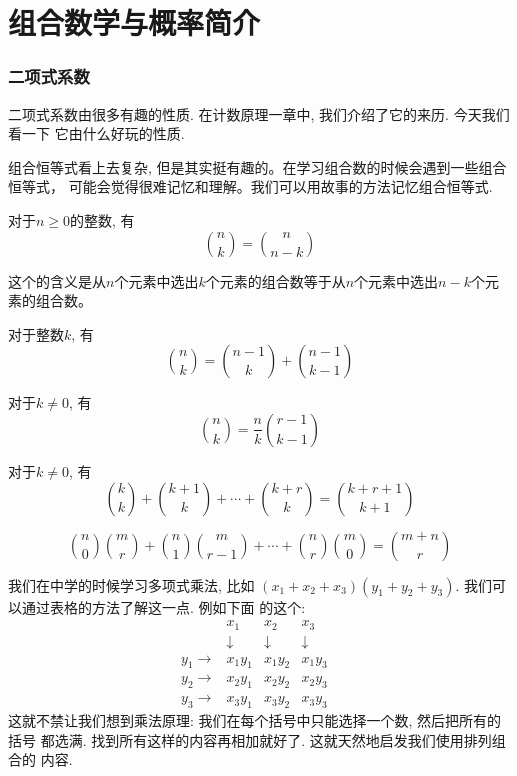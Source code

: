 \part{组合数学与概率简介}

\section{二项式系数}
二项式系数由很多有趣的性质. 在计数原理一章中, 我们介绍了它的来历. 今天我们看一下
它由什么好玩的性质. 

组合恒等式看上去复杂, 但是其实挺有趣的。在学习组合数的时候会遇到一些组合恒等式，
可能会觉得很难记忆和理解。我们可以用故事的方法记忆组合恒等式. 

\begin{theorem} 对于$n\geq 0$的整数, 有
    $$\binom nk = \binom {n}{n-k}$$
\end{theorem}

这个的含义是从$n$个元素中选出$k$个元素的组合数等于从$n$个元素中选出$n-k$个元素的组合数。

\begin{theorem}对于整数$k$, 有
    $$\binom nk = \binom {n-1}{k} + \binom {n-1}{k-1}$$
\end{theorem}

\begin{theorem} 对于$k\neq 0$, 有
    $$\binom nk = \frac nk {\binom {r-1}{k-1}}$$
\end{theorem}

\begin{theorem} 对于$k\neq 0$, 有
    $$\binom kk+\binom{k+1}k+\cdots+\binom{k+r}k=\binom{k+r+1}{k+1}$$
\end{theorem}

\begin{theorem}[Vandermonde卷积] 
    $$\binom n0 \binom mr+\binom{n}1\binom{m}{r-1}+\cdots+\binom nr\binom m0=\binom{m+n}{r}$$
\end{theorem}

 我们在中学的时候学习多项式乘法, 比如
$(x_1+x_2+x_3)(y_1+y_2+y_3)$. 我们可以通过表格的方法了解这一点. 例如下面
的这个: 
$$
\begin{matrix}
    &x_1  &x_2  &x_3  & \\
    & \downarrow  & \downarrow & \downarrow & \\
  y_1\rightarrow   & x_1y_1 &  x_1y_2& x_1y_3 & \\
  y_2\rightarrow   & x_2y_1 &  x_2y_2& x_2y_3 & \\
  y_3\rightarrow   & x_3y_1 &  x_3y_2& x_3y_3 &
\end{matrix}
$$
这就不禁让我们想到乘法原理: 我们在每个括号中只能选择一个数, 然后把所有的括号
都选满. 找到所有这样的内容再相加就好了. 这就天然地启发我们使用排列组合的
内容.


